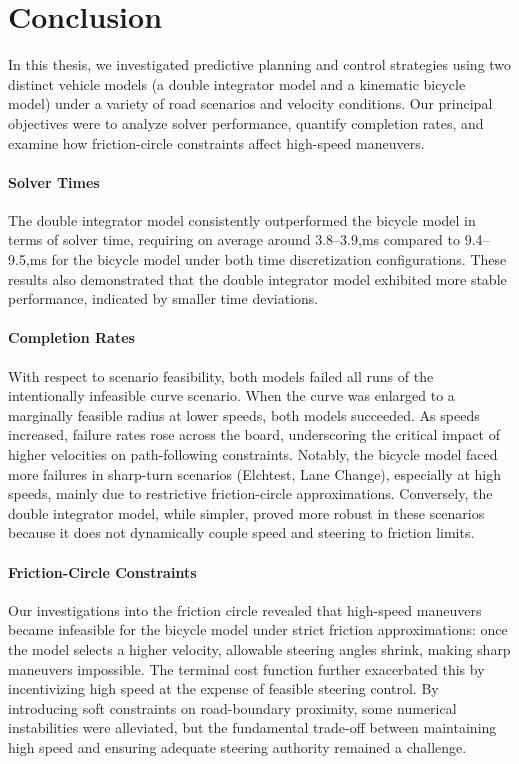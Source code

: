\section{Conclusion} \label{subsec:conclusion}

In this thesis, we investigated predictive planning and control strategies using two distinct vehicle models (a double integrator model and a
kinematic bicycle model) under a variety of road scenarios and velocity conditions.
Our principal objectives were to analyze solver performance, quantify completion rates, and examine how friction-circle constraints affect high-speed
maneuvers.

\paragraph{Solver Times}
The double integrator model consistently outperformed the bicycle model in terms of solver time, requiring on average around 3.8--3.9,ms compared to
9.4--9.5,ms for the bicycle model under both time discretization configurations.
These results also demonstrated that the double integrator model exhibited more stable performance, indicated by smaller time deviations.

\paragraph{Completion Rates}
With respect to scenario feasibility, both models failed all runs of the intentionally infeasible curve scenario.
When the curve was enlarged to a marginally feasible radius at lower speeds, both models succeeded.
As speeds increased, failure rates rose across the board, underscoring the critical impact of higher velocities on path-following constraints.
Notably, the bicycle model faced more failures in sharp-turn scenarios (Elchtest, Lane Change), especially at high speeds, mainly due to restrictive
friction-circle approximations.
Conversely, the double integrator model, while simpler, proved more robust in these scenarios because it does not dynamically couple speed and
steering to friction limits.

\paragraph{Friction-Circle Constraints}
Our investigations into the friction circle revealed that high-speed maneuvers became infeasible for the bicycle model under strict friction
approximations: once the model selects a higher velocity, allowable steering angles shrink, making sharp maneuvers impossible.
The terminal cost function further exacerbated this by incentivizing high speed at the expense of feasible steering control.
By introducing soft constraints on road-boundary proximity, some numerical instabilities were alleviated, but the fundamental trade-off between
maintaining high speed and ensuring adequate steering authority remained a challenge.

